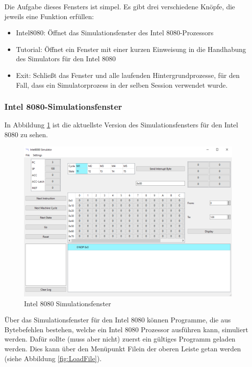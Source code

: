 \documentclass[12pt]{article}
\newcommand{\imgSpaceBefore}{\vspace{10pt}}
\begin{document}
\noindent
Die Aufgabe dieses Fensters ist simpel. Es gibt drei verschiedene Knöpfe, die jeweils eine Funktion erfüllen:
\begin{itemize}
	\item Intel8080: Öffnet das Simulationsfenster des Intel 8080-Prozessors
	\item Tutorial: Öffnet ein Fenster mit einer kurzen Einweisung in die Handhabung des Simulators für den Intel 8080
	\item Exit: Schließt das Fenster und alle laufenden Hintergrundprozesse, für den Fall, dass ein Simulatorprozess in der selben Session verwendet wurde.
\end{itemize}

\subsubsection{Intel 8080-Simulationsfenster}
In Abbildung \ref{fig:I8080MW} ist die aktuellste Version des Simulationsfensters für den Intel 8080 zu sehen.\imgSpaceBefore

\begin{figure}[H]
\centering
\includegraphics[width=15cm]{bilder/Intel8080_MainWindow}
\caption{Intel 8080 Simulationsfenster}
\label{fig:I8080MW}
\end{figure}

\noindent
Über das Simulationsfenster für den Intel 8080 können Programme, die aus Bytebefehlen bestehen, welche ein Intel 8080 Prozessor ausführen kann, simuliert werden. Dafür sollte (muss aber nicht) zuerst ein gültiges Programm geladen werden. Dies kann über den Menüpunkt \glqq File\grqq in der oberen Leiste getan werden (siehe Abbildung \ref{fig:LoadFile}).\imgSpaceBefore
\end{document}
